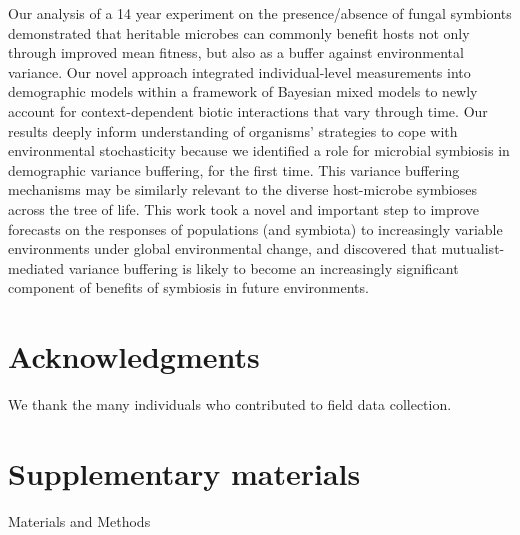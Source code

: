 \documentclass[12pt]{article}
\begin{document}
Our analysis of a 14 year experiment on the presence/absence of fungal symbionts demonstrated that heritable microbes can commonly benefit hosts not only through improved mean fitness, but also as a buffer against environmental variance. 
Our novel approach integrated individual-level measurements into demographic models within a framework of Bayesian mixed models to newly account for context-dependent biotic interactions that vary through time.
Our results deeply inform understanding of organisms' strategies to cope with environmental stochasticity because we identified a role for microbial symbiosis in demographic variance buffering, for the first time. 
This variance buffering mechanisms may be similarly relevant to the diverse host-microbe symbioses across the tree of life.
This work took a novel and important step to improve forecasts on the responses of populations (and symbiota) to increasingly variable environments under global environmental change, and discovered that mutualist-mediated variance buffering is likely to become an increasingly significant component of benefits of symbiosis in future environments.














\section*{Acknowledgments}
We thank the many individuals who contributed to field data collection.


\section*{Supplementary materials}
Materials and Methods\\
\end{document}
